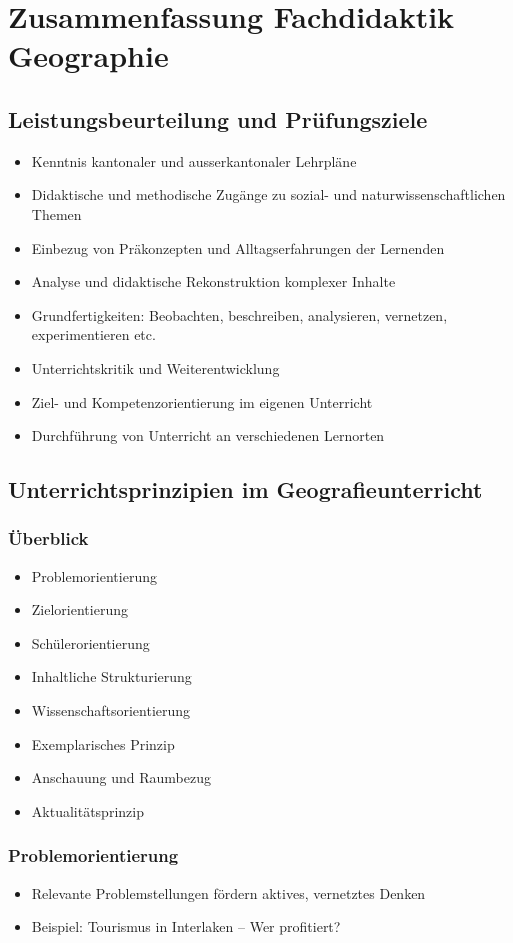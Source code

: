 \chapter{Zusammenfassung Fachdidaktik Geographie}
\section{Leistungsbeurteilung und Prüfungsziele}
\begin{itemize}[leftmargin=*]
  \item Kenntnis kantonaler und ausserkantonaler Lehrpläne
  \item Didaktische und methodische Zugänge zu sozial- und naturwissenschaftlichen Themen
  \item Einbezug von Präkonzepten und Alltagserfahrungen der Lernenden
  \item Analyse und didaktische Rekonstruktion komplexer Inhalte
  \item Grundfertigkeiten: Beobachten, beschreiben, analysieren, vernetzen, experimentieren etc.
  \item Unterrichtskritik und Weiterentwicklung
  \item Ziel- und Kompetenzorientierung im eigenen Unterricht
  \item Durchführung von Unterricht an verschiedenen Lernorten
\end{itemize}

\section{Unterrichtsprinzipien im Geografieunterricht}
\subsection{Überblick}
\begin{itemize}[leftmargin=*]
  \item Problemorientierung
  \item Zielorientierung
  \item Schülerorientierung
  \item Inhaltliche Strukturierung
  \item Wissenschaftsorientierung
  \item Exemplarisches Prinzip
  \item Anschauung und Raumbezug
  \item Aktualitätsprinzip
\end{itemize}

\subsection{Problemorientierung}
\begin{itemize}[leftmargin=*]
  \item Relevante Problemstellungen fördern aktives, vernetztes Denken
  \item Beispiel: Tourismus in Interlaken – Wer profitiert?
\end{itemize}

